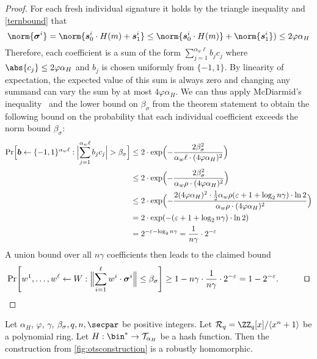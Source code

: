 \begin{proof}
  For each fresh individual signature it holds by the triangle inequality and \autoref{ternbound} that
  \[
    \norm{\vec{\sigma}^i} = \norm{\vec{s}_0^i\cdot H(m)+\vec{s}_1^i} \leq \norm{\vec{s}_0^i\cdot H(m)}+\norm{\vec{s}_1^i})
    \leq 2\varphi\alpha_H
  \]
  Therefore, each coefficient is a sum of the form
  \(
    \sum_{j=1}^{\alpha_w\ell}b_j c_j
  \)
  where $\abs{c_j}\leq 2\varphi\alpha_H$ and $b_j$ is chosen uniformly from $\{-1,1\}$.
  By linearity of expectation, the expected value of this sum is always zero and changing any summand can vary the sum by at most $4\varphi\alpha_H$. We can thus apply McDiarmid's inequality~\cite{McDiarmid89} and the lower bound on $\beta_\sigma$ from the theorem statement to obtain the following bound on the probability that each individual coefficient exceeds the norm bound $\beta_\sigma$:
  \begin{align*}
    \Pr\Bigl[\vec{b}\gets\{-1,1\}^{\alpha_w\ell} : \Bigl|\smashoperator{\sum_{j=1}^{\alpha_w\ell}}b_j c_j\Bigr| > \beta_\sigma\Bigr]
    \leq{}& 2\cdot\exp\Bigl(-\frac{2\beta_\sigma^2}{\alpha_w\ell\cdot (4\varphi\alpha_H)^2}\Bigr)\\
    \leq{}& 2\cdot\exp\Bigl(-\frac{2\beta_\sigma^2}{\alpha_w\rho\cdot (4\varphi\alpha_H)^2}\Bigr)\\
    \leq{}& 2\cdot\exp\Bigl(-\frac{2(4\varphi\alpha_H)^2\cdot\tfrac{1}{2}\alpha_w\rho(\varepsilon+1+\log_2n\gamma)\cdot\ln2}{\alpha_w\rho\cdot (4\varphi\alpha_H)^2}\Bigr)\\
    ={}& 2\cdot\exp(-(\varepsilon+1+\log_2n\gamma)\cdot\ln2)\\
    ={}& 2^{-\varepsilon-\log_2n\gamma} = \frac{1}{n\gamma}\cdot 2^{-\varepsilon}
  \end{align*}
  A union bound over all $n\gamma$ coefficients then leads to the claimed bound
  \[
    \Pr\mleft[
      w^1,\dots,w^\ell\gets W
      :
      \Bigl\Vert\sum_{i=1}^{\ell} w^i\cdot\vec{\sigma}^i\Bigr\Vert \leq \beta_\sigma\mright] \geq 1- n\gamma\cdot\frac{1}{n\gamma}\cdot 2^{-\varepsilon} = 1-2^{-\varepsilon}.\tag*{\qed}
  \]
\end{proof}

\begin{lemma}\label{lem:kots_homomorphic}
Let $\alpha_H$, $\varphi$, $\gamma$, $\beta_\sigma,q,n,\secpar$ be positive integers.
  Let $\ring_q=\ZZ_q[x]/\langle x^n+1\rangle$ be a polynomial ring.
Let $H : \bin^* \to \tern_{\alpha_H}$ be a hash function.
  Then the construction from \autoref{fig:otsconstruction} is a robustly homomorphic.
\end{lemma}

